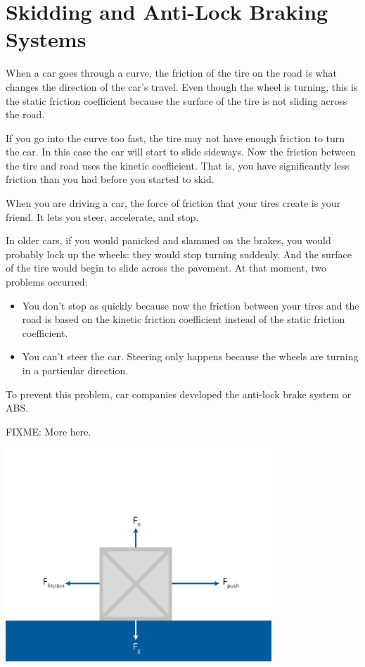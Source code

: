 \section{Skidding and Anti-Lock Braking Systems}

When a car goes through a curve,  the friction of the tire on the road is what changes the direction of the 
car's travel.  Even though the wheel is turning,   this is the static friction coefficient because the surface of the tire is not sliding across the road.

If you go into the curve too fast,  the tire may not have enough friction to turn the car.  In this case the car will start to slide sideways.  Now the friction between the tire and road uses the kinetic coefficient.  That is,   you have significantly less friction than you had before you started to skid.

When you are driving a car,  the force of friction that your tires create is your friend.  It lets you steer, accelerate, and stop.

In older cars,  if you would panicked  and slammed on the brakes,  you would probably lock up the wheels: they would stop turning suddenly.  And the surface of the tire would begin to slide across the pavement.  At that moment,  two problems occurred:
\begin{itemize}
\item You don't stop as quickly because now the friction between your tires and the road is based on the kinetic friction coefficient instead of the static friction coefficient.
\item You can't steer the car.  Steering only happens because the wheels are turning in a particular direction.
\end{itemize}

To prevent this problem,  car companies developed the anti-lock brake system or ABS.

FIXME: More here.

\includegraphics[width=0.75\textwidth]{friction-01.png}


